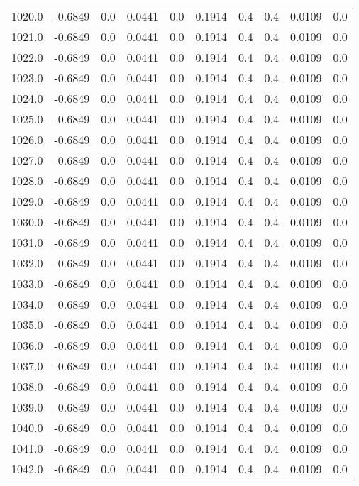 \begin{longtable}{lrrrrrrrrr}
1020.0 & -0.6849 & 0.0 & 0.0441 & 0.0 & 0.1914 & 0.4 & 0.4 & 0.0109 & 0.0 \\
1021.0 & -0.6849 & 0.0 & 0.0441 & 0.0 & 0.1914 & 0.4 & 0.4 & 0.0109 & 0.0 \\
1022.0 & -0.6849 & 0.0 & 0.0441 & 0.0 & 0.1914 & 0.4 & 0.4 & 0.0109 & 0.0 \\
1023.0 & -0.6849 & 0.0 & 0.0441 & 0.0 & 0.1914 & 0.4 & 0.4 & 0.0109 & 0.0 \\
1024.0 & -0.6849 & 0.0 & 0.0441 & 0.0 & 0.1914 & 0.4 & 0.4 & 0.0109 & 0.0 \\
1025.0 & -0.6849 & 0.0 & 0.0441 & 0.0 & 0.1914 & 0.4 & 0.4 & 0.0109 & 0.0 \\
1026.0 & -0.6849 & 0.0 & 0.0441 & 0.0 & 0.1914 & 0.4 & 0.4 & 0.0109 & 0.0 \\
1027.0 & -0.6849 & 0.0 & 0.0441 & 0.0 & 0.1914 & 0.4 & 0.4 & 0.0109 & 0.0 \\
1028.0 & -0.6849 & 0.0 & 0.0441 & 0.0 & 0.1914 & 0.4 & 0.4 & 0.0109 & 0.0 \\
1029.0 & -0.6849 & 0.0 & 0.0441 & 0.0 & 0.1914 & 0.4 & 0.4 & 0.0109 & 0.0 \\
1030.0 & -0.6849 & 0.0 & 0.0441 & 0.0 & 0.1914 & 0.4 & 0.4 & 0.0109 & 0.0 \\
1031.0 & -0.6849 & 0.0 & 0.0441 & 0.0 & 0.1914 & 0.4 & 0.4 & 0.0109 & 0.0 \\
1032.0 & -0.6849 & 0.0 & 0.0441 & 0.0 & 0.1914 & 0.4 & 0.4 & 0.0109 & 0.0 \\
1033.0 & -0.6849 & 0.0 & 0.0441 & 0.0 & 0.1914 & 0.4 & 0.4 & 0.0109 & 0.0 \\
1034.0 & -0.6849 & 0.0 & 0.0441 & 0.0 & 0.1914 & 0.4 & 0.4 & 0.0109 & 0.0 \\
1035.0 & -0.6849 & 0.0 & 0.0441 & 0.0 & 0.1914 & 0.4 & 0.4 & 0.0109 & 0.0 \\
1036.0 & -0.6849 & 0.0 & 0.0441 & 0.0 & 0.1914 & 0.4 & 0.4 & 0.0109 & 0.0 \\
1037.0 & -0.6849 & 0.0 & 0.0441 & 0.0 & 0.1914 & 0.4 & 0.4 & 0.0109 & 0.0 \\
1038.0 & -0.6849 & 0.0 & 0.0441 & 0.0 & 0.1914 & 0.4 & 0.4 & 0.0109 & 0.0 \\
1039.0 & -0.6849 & 0.0 & 0.0441 & 0.0 & 0.1914 & 0.4 & 0.4 & 0.0109 & 0.0 \\
1040.0 & -0.6849 & 0.0 & 0.0441 & 0.0 & 0.1914 & 0.4 & 0.4 & 0.0109 & 0.0 \\
1041.0 & -0.6849 & 0.0 & 0.0441 & 0.0 & 0.1914 & 0.4 & 0.4 & 0.0109 & 0.0 \\
1042.0 & -0.6849 & 0.0 & 0.0441 & 0.0 & 0.1914 & 0.4 & 0.4 & 0.0109 & 0.0 \\

\end{longtable}
